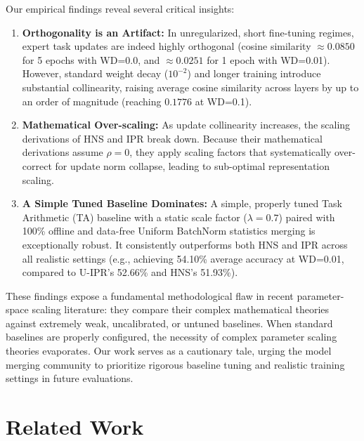 \documentclass{article}
\theoremstyle{plain}
\theoremstyle{definition}
\theoremstyle{remark}
\begin{document}
Our empirical findings reveal several critical insights:
\begin{enumerate}
    \item \textbf{Orthogonality is an Artifact:} In unregularized, short fine-tuning regimes, expert task updates are indeed highly orthogonal (cosine similarity $\approx 0.0850$ for 5 epochs with WD=0.0, and $\approx 0.0251$ for 1 epoch with WD=0.01). However, standard weight decay ($10^{-2}$) and longer training introduce substantial collinearity, raising average cosine similarity across layers by up to an order of magnitude (reaching $0.1776$ at WD=0.1).
    \item \textbf{Mathematical Over-scaling:} As update collinearity increases, the scaling derivations of HNS and IPR break down. Because their mathematical derivations assume $\rho = 0$, they apply scaling factors that systematically over-correct for update norm collapse, leading to sub-optimal representation scaling.
    \item \textbf{A Simple Tuned Baseline Dominates:} A simple, properly tuned Task Arithmetic (TA) baseline with a static scale factor ($\lambda = 0.7$) paired with 100\% offline and data-free Uniform BatchNorm statistics merging is exceptionally robust. It consistently outperforms both HNS and IPR across all realistic settings (e.g., achieving 54.10\% average accuracy at WD=0.01, compared to U-IPR's 52.66\% and HNS's 51.93\%).
\end{enumerate}

These findings expose a fundamental methodological flaw in recent parameter-space scaling literature: they compare their complex mathematical theories against extremely weak, uncalibrated, or untuned baselines. When standard baselines are properly configured, the necessity of complex parameter scaling theories evaporates. Our work serves as a cautionary tale, urging the model merging community to prioritize rigorous baseline tuning and realistic training settings in future evaluations.

\section{Related Work}
\label{sec:related}
\end{document}

